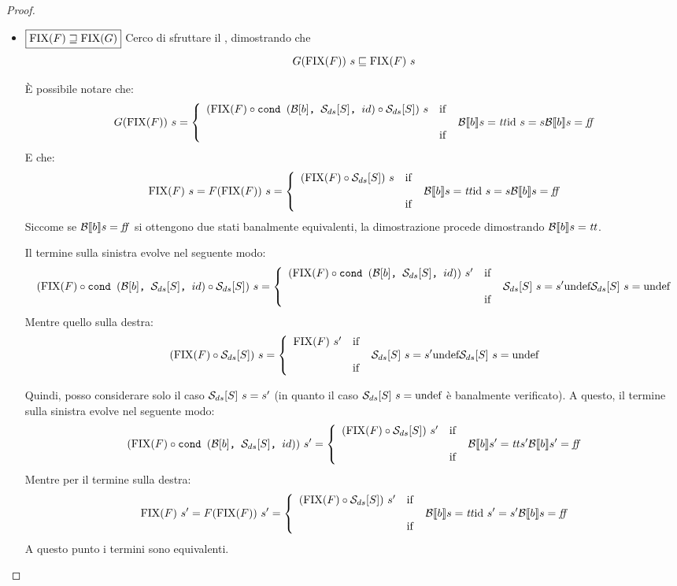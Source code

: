 {\begin{proof}
\begin{itemize}
  \item $\boxed{\textrm{\normalfont{FIX}}(F) \sqsupseteq \textrm{\normalfont{FIX}}(G)}$
  Cerco di sfruttare il \FPIL, dimostrando che
  $$
  G(\fixp{F})\ s \sqsubseteq \fixp{F}\ s
  $$

  È possibile notare che:
  $$
  G(\fixp{F})\ s =
    \caseFun{(\fixp{F} \circ
                 \cond{b}{\dsCtxt{S}}{id} \circ \dsCtxt{S})\ s}
            {\B{b} = \semtrue}
            {\idDS\ s = s}
            {\B{b} = \semfalse}
  $$
  E che:
  $$
  \fixp{F}\ s = F(\fixp{F})\ s =
    \caseFun{(\fixp{F} \circ \dsCtxt{S})\ s}
            {\B{b} = \semtrue}
            {\idDS\ s = s}
            {\B{b} = \semfalse}
  $$
  Siccome se $\mathcal{B} \llbracket b \rrbracket s = \mbox{\textit{ff}}$ si ottengono due stati banalmente equivalenti,
  la dimostrazione procede dimostrando $\mathcal{B} \llbracket b \rrbracket s = \mbox{\textit{tt}}$.

  Il termine sulla sinistra evolve nel seguente modo:
  $$
  (\fixp{F} \circ \cond{b}{\dsCtxt{S}}{id} \circ \dsCtxt{S})\ s =
    \caseFun{(\fixp{F} \circ
                 \cond{b}{\dsCtxt{S}}{id})\ s'}
            {\dsCtxt{S}\ s = s'}
            {\undefDS}
            {\dsCtxt{S}\ s = \undefDS}
  $$
  Mentre quello sulla destra:
  $$
  (\fixp{F} \circ \dsCtxt{S})\ s =
    \caseFun{\fixp{F}\ s'}
            {\dsCtxt{S}\ s = s'}
            {\undefDS}
            {\dsCtxt{S}\ s = \undefDS}
  $$

  Quindi, posso considerare solo il caso $\mathcal{S}_{ds}[S]\ s = s'$ (in quanto il
  caso $\mathcal{S}_{ds}[S]\ s = \textrm{\normalfont{undef}}$ è banalmente verificato). A questo, il
  termine sulla sinistra evolve nel seguente modo:
  $$
  (\fixp{F} \circ \cond{b}{\dsCtxt{S}}{id})\ s' =
    \caseFun{(\fixp{F} \circ \dsCtxt{S})\ s'}
            {\B{b}' = \semtrue}
            {s'}
            {\B{b}' = \semfalse}
  $$
  Mentre per il termine sulla destra:
  $$
  \fixp{F}\ s' = F(\fixp{F})\ s' =
    \caseFun{(\fixp{F} \circ \dsCtxt{S})\ s'}
            {\B{b} = \semtrue}
            {\idDS\ s' = s'}
            {\B{b} = \semfalse}
  $$
  A questo punto i termini sono equivalenti.
\end{itemize}

\end{proof}

}
